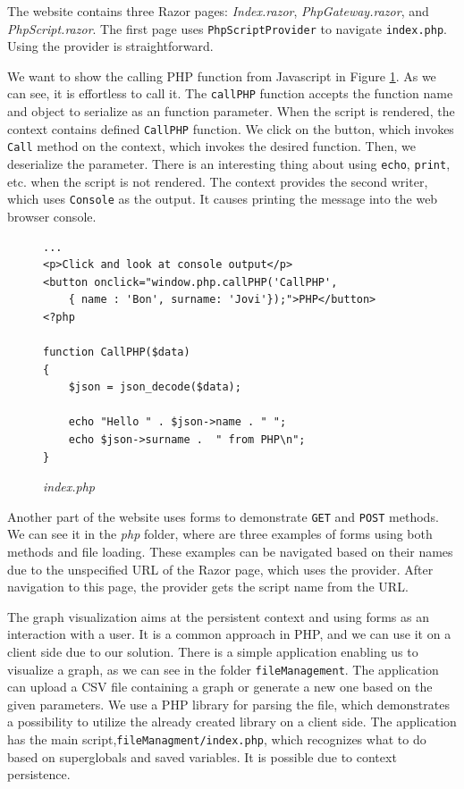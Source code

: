 The website contains three Razor pages: \textit{Index.razor}, \textit{PhpGateway.razor}, and \textit{PhpScript.razor}.
The first page uses \texttt{PhpScriptProvider} to navigate \texttt{index.php}.
Using the provider is straightforward.
\par
We want to show the calling PHP function from Javascript in Figure \ref{img26:index}.
As we can see, it is effortless to call it.
The \texttt{callPHP} function accepts the function name and object to serialize as an function parameter.
When the script is rendered, the context contains defined \texttt{CallPHP} function.
We click on the button, which invokes \texttt{Call} method on the context, which invokes the desired function.
Then, we deserialize the parameter.
There is an interesting thing about using \texttt{echo}, \texttt{print}, etc. when the script is not rendered.
The context provides the second writer, which uses \texttt{Console} as the output.
It causes printing the message into the web browser console.
\begin{figure}
\begin{lstlisting}
...
<p>Click and look at console output</p>
<button onclick="window.php.callPHP('CallPHP',
	{ name : 'Bon', surname: 'Jovi'});">PHP</button>
<?php

function CallPHP($data)
{
    $json = json_decode($data); 

	echo "Hello " . $json->name . " ";
	echo $json->surname .  " from PHP\n";
}
\end{lstlisting}
\caption{\textit{index.php}}
\label{img26:index}
\end{figure}
\par
Another part of the website uses forms to demonstrate \texttt{GET} and \texttt{POST} methods.
We can see it in the \textit{php} folder, where are three examples of forms using both methods and file loading.
These examples can be navigated based on their names due to the unspecified URL of the Razor page, which uses the provider.
After navigation to this page, the provider gets the script name from the URL.
\par
The graph visualization aims at the persistent context and using forms as an interaction with a user.
It is a common approach in PHP, and we can use it on a client side due to our solution.
There is a simple application enabling us to visualize a graph, as we can see in the folder \texttt{fileManagement}.
The application can upload a CSV file containing a graph or generate a new one based on the given parameters.
We use a PHP library for parsing the file, which demonstrates a possibility to utilize the already created library on a client side.
The application has the main script,\texttt{fileManagment/index.php}, which recognizes what to do based on superglobals and saved variables.
It is possible due to context persistence.

